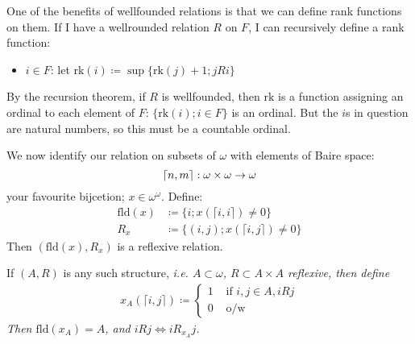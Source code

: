 \documentclass[]{article}
\newcommand{\om}{\omega}
\newcommand{\rk}{\textrm{rk}}
\newcommand{\fld}{\textrm{fld}}
\begin{document}
One of the benefits of wellfounded relations is that we can define rank functions on them. If I have a wellrounded relation $R$ on $F$, I can recursively define a rank function:
\begin{itemize}
    \item $i\in F$: let rk$(i)\coloneqq \sup \{\rk(j)+1;jRi\}$
\end{itemize}
By the recursion theorem, if $R$ is wellfounded, then $\rk$ is a function assigning an ordinal to each element of $F$: $\{\rk(i);i\in F\}$ is an ordinal. But the $i$s in question are natural numbers, so this must be a countable ordinal.

We now identify our relation on subsets of $\om$ with elements of Baire space:
$$ \lceil n,m\rceil :\om\times\om\ra\om$$
your favourite bijcetion; $x \in \om^\om$. Define:
\begin{align*}
    \fld(x)&\coloneqq \{i;x(\lceil i,i\rceil) \ne 0\}\\
    R_x &\coloneqq \{(i,j); x(\lceil i,j\rceil)\ne 0\}
\end{align*}
Then $(\fld(x),R_x)$ is a reflexive relation.

If $(A,R)$ is any such structure, \it{i.e.} $A\subset \om$, $R\subset A\times A$ reflexive, then define
\begin{align*}
    x_A(\lceil i,j\rceil)\coloneqq \left\lbrace \begin{array}{cc} 1 & \textrm{ if }i,j\in A,iRj\\ 0 & \textrm{ o/w}\end{array}\right.
\end{align*}
Then $\fld(x_A) = A$, and $iRj\iff iR_{x_A}j$.
\end{document}
